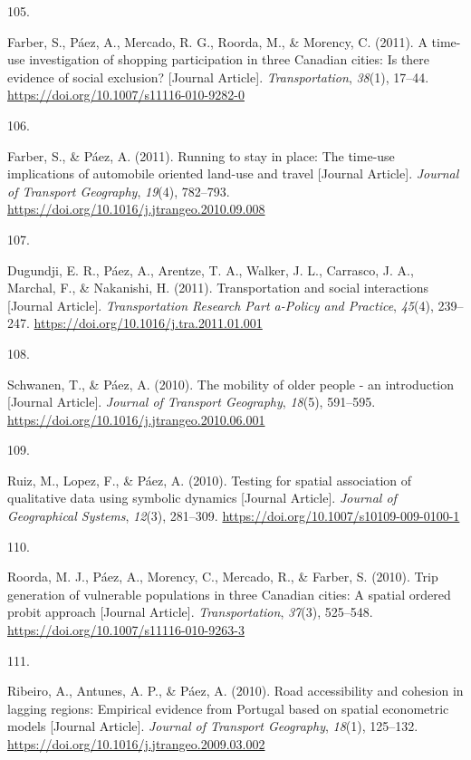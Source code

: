 \documentclass[11pt,a4paper,]{awesome-cv}
\newlength{\cslhangindent}
\newlength{\csllabelwidth}
\newenvironment{CSLReferences}[2] %
 {\begin{list}{}{%
  \setlength{\itemindent}{0pt}
  \setlength{\leftmargin}{0pt}
  \setlength{\parsep}{0pt}
  \ifodd #1
   \setlength{\leftmargin}{\cslhangindent}
   \setlength{\itemindent}{-1\cslhangindent}
  \fi
  \setlength{\itemsep}{#2\baselineskip}}}
 {\end{list}}
\newcommand{\CSLLeftMargin}[1]{\parbox[t]{\csllabelwidth}{\strut#1\strut}}
\newcommand{\CSLRightInline}[1]{\parbox[t]{\linewidth - \csllabelwidth}{\strut#1\strut}}
\begin{document}
\begin{CSLReferences}{0}{0}
\CSLLeftMargin{105. }%
\CSLRightInline{Farber, S., Páez, A., Mercado, R. G., Roorda, M., \&
Morency, C. (2011). A time-use investigation of shopping participation
in three Canadian cities: Is there evidence of social exclusion?
{[}Journal Article{]}. \emph{Transportation}, \emph{38}(1), 17--44.
\url{https://doi.org/10.1007/s11116-010-9282-0}}

\CSLLeftMargin{106. }%
\CSLRightInline{Farber, S., \& Páez, A. (2011). Running to stay in
place: The time-use implications of automobile oriented land-use and
travel {[}Journal Article{]}. \emph{Journal of Transport Geography},
\emph{19}(4), 782--793.
\url{https://doi.org/10.1016/j.jtrangeo.2010.09.008}}

\CSLLeftMargin{107. }%
\CSLRightInline{Dugundji, E. R., Páez, A., Arentze, T. A., Walker, J.
L., Carrasco, J. A., Marchal, F., \& Nakanishi, H. (2011).
Transportation and social interactions {[}Journal Article{]}.
\emph{Transportation Research Part a-Policy and Practice}, \emph{45}(4),
239--247. \url{https://doi.org/10.1016/j.tra.2011.01.001}}

\CSLLeftMargin{108. }%
\CSLRightInline{Schwanen, T., \& Páez, A. (2010). The mobility of older
people - an introduction {[}Journal Article{]}. \emph{Journal of
Transport Geography}, \emph{18}(5), 591--595.
\url{https://doi.org/10.1016/j.jtrangeo.2010.06.001}}

\CSLLeftMargin{109. }%
\CSLRightInline{Ruiz, M., Lopez, F., \& Páez, A. (2010). Testing for
spatial association of qualitative data using symbolic dynamics
{[}Journal Article{]}. \emph{Journal of Geographical Systems},
\emph{12}(3), 281--309. \url{https://doi.org/10.1007/s10109-009-0100-1}}

\CSLLeftMargin{110. }%
\CSLRightInline{Roorda, M. J., Páez, A., Morency, C., Mercado, R., \&
Farber, S. (2010). Trip generation of vulnerable populations in three
Canadian cities: A spatial ordered probit approach {[}Journal
Article{]}. \emph{Transportation}, \emph{37}(3), 525--548.
\url{https://doi.org/10.1007/s11116-010-9263-3}}

\CSLLeftMargin{111. }%
\CSLRightInline{Ribeiro, A., Antunes, A. P., \& Páez, A. (2010). Road
accessibility and cohesion in lagging regions: Empirical evidence from
Portugal based on spatial econometric models {[}Journal Article{]}.
\emph{Journal of Transport Geography}, \emph{18}(1), 125--132.
\url{https://doi.org/10.1016/j.jtrangeo.2009.03.002}}


\end{CSLReferences}
\end{document}
